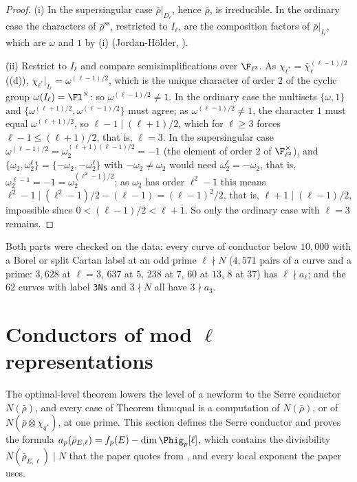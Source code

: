 \begin{proof}
(i) In the supersingular case $\bar\rho|_{D_\ell}$, hence $\bar\rho$, is irreducible. In the ordinary case the characters of $\bar\rho^{\mathrm{ss}}$, restricted to $I_\ell$, are
the composition factors of $\bar\rho|_{I_\ell}$, which are $\omega$ and $1$ by (i) (Jordan-H\"older, ).

(ii) Restrict to $I_\ell$ and compare semisimplifications over $\F_{\ell^2}$. As $\chi_{\ell^*}=\bar\chi_\ell^{(\ell-1)/2}$ ((d)),
$\chi_{\ell^*}|_{I_\ell}=\omega^{(\ell-1)/2}$, which is the unique character of order $2$ of the cyclic group $\omega(I_\ell)=\Fl^\times$: so $\omega^{(\ell-1)/2}\ne1$. In the ordinary
case the multisets $\{\omega,1\}$ and $\{\omega^{(\ell+1)/2},\omega^{(\ell-1)/2}\}$ must agree; as $\omega^{(\ell-1)/2}\ne1$, the character $1$ must equal $\omega^{(\ell+1)/2}$, so
$\ell-1\mid(\ell+1)/2$, which for $\ell\ge3$ forces $\ell-1\le(\ell+1)/2$, that is, $\ell=3$. In the supersingular case $\omega^{(\ell-1)/2}=\omega_2^{(\ell+1)(\ell-1)/2}=-1$ (the
element of order $2$ of $\F_{\ell^2}^\times$), and $\{\omega_2,\omega_2^\ell\}=\{-\omega_2,-\omega_2^\ell\}$ with $-\omega_2\ne\omega_2$ would need $\omega_2^\ell=-\omega_2$, that is,
$\omega_2^{\ell-1}=-1=\omega_2^{(\ell^2-1)/2}$; as $\omega_2$ has order $\ell^2-1$ this means $\ell^2-1\mid(\ell^2-1)/2-(\ell-1)=(\ell-1)^2/2$, that is, $\ell+1\mid(\ell-1)/2$,
impossible since $0<(\ell-1)/2<\ell+1$. So only the ordinary case with $\ell=3$ remains.
\end{proof}

Both parts were checked on the data: every curve of conductor below $10{,}000$ with a Borel or split Cartan label at an odd prime
$\ell\nmid N$ ($4{,}571$ pairs of a curve and a prime: $3{,}628$ at $\ell=3$, $637$ at $5$, $238$ at $7$, $60$ at $13$, $8$ at $37$) has $\ell\nmid a_\ell$; and the
$62$ curves with label \texttt{3Ns} and $3\nmid N$ all have $3\nmid a_3$.

\section[Conductors of mod \texorpdfstring{$\ell$}{l} representations]{Conductors of mod \texorpdfstring{$\ell$}{l} representations}\label{sec:galrep:conductors}

The optimal-level theorem lowers the level of a newform to the Serre conductor $N(\bar\rho)$, and every case of Theorem thm:qual is a
computation of $N(\bar\rho)$, or of $N(\bar\rho\otimes\chi_{q^*})$, at one prime. This section defines the Serre conductor and proves the formula
$a_p(\bar\rho_{E,\ell})=f_p(E)-\dim\Phig_p[\ell]$, which contains the divisibility $N(\bar\rho_{E,\ell})\mid N$ that the paper quotes from \cite{Carayol89}, and every
local exponent the paper uses.

